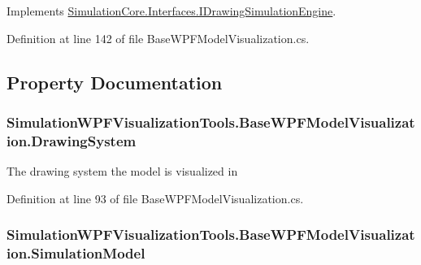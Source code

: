 Implements \hyperlink{interface_simulation_core_1_1_interfaces_1_1_i_drawing_simulation_engine_a9cd622bd39311b9a7ba3479f348371dd}{Simulation\+Core.\+Interfaces.\+I\+Drawing\+Simulation\+Engine}.



Definition at line 142 of file Base\+W\+P\+F\+Model\+Visualization.\+cs.



\subsection{Property Documentation}
\subsubsection[{\texorpdfstring{Drawing\+System}{DrawingSystem}}]{ Simulation\+W\+P\+F\+Visualization\+Tools.\+Base\+W\+P\+F\+Model\+Visualization.\+Drawing\+System\hspace{0.3cm}{\ttfamily [get]}}\hypertarget{class_simulation_w_p_f_visualization_tools_1_1_base_w_p_f_model_visualization_a6ddba54c1d3d393225c7b4fbcf617f31}{}\label{class_simulation_w_p_f_visualization_tools_1_1_base_w_p_f_model_visualization_a6ddba54c1d3d393225c7b4fbcf617f31}


The drawing system the model is visualized in 



Definition at line 93 of file Base\+W\+P\+F\+Model\+Visualization.\+cs.

\subsubsection[{\texorpdfstring{Simulation\+Model}{SimulationModel}}]{ Simulation\+W\+P\+F\+Visualization\+Tools.\+Base\+W\+P\+F\+Model\+Visualization.\+Simulation\+Model\hspace{0.3cm}{\ttfamily [get]}}\hypertarget{class_simulation_w_p_f_visualization_tools_1_1_base_w_p_f_model_visualization_a50f6b111bff56cd4c29ff0fa67e43b6b}{}\label{class_simulation_w_p_f_visualization_tools_1_1_base_w_p_f_model_visualization_a50f6b111bff56cd4c29ff0fa67e43b6b}


